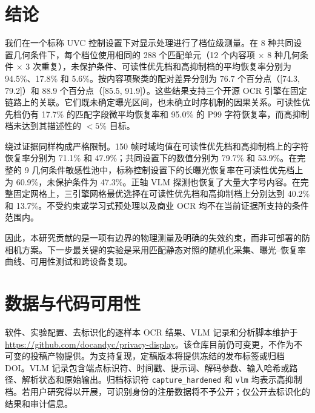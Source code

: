 \documentclass{ieeeaccess}
\begin{document}
\section{结论}
\label{sec:conclusion}

我们在一个标称 UVC 控制设置下对显示处理进行了档位级测量。在 8 种共同设置几何条件下，每个档位使用相同的 288 个匹配单元（12 个内容项 $\times$ 8 种几何条件 $\times$ 3 次重复），未保护条件、可读性优先档和高抑制档的平均恢复率分别为 94.5\%、17.8\% 和 5.6\%。按内容项聚类的配对差异分别为 76.7 个百分点（[74.3, 79.2]）和 88.9 个百分点（[85.5, 91.9]）。这些结果支持三个开源 OCR 引擎在固定链路上的关联。它们既未确定曝光区间，也未确立时序机制的因果关系。可读性优先档仍有 17.7\% 的匹配字段微平均恢复率和 95.0\% 的 P99 字符恢复率，而高抑制档未达到其描述性的 $<5\%$ 目标。

绕过证据同样构成严格限制。150 帧时域均值在可读性优先档和高抑制档上的字符恢复率分别为 71.1\% 和 47.9\%；共同设置下的数值分别为 79.7\% 和 53.9\%。在完整的 9 几何条件敏感性池中，标称控制设置下的长曝光恢复率在可读性优先档上为 60.9\%，未保护条件为 47.3\%。正轴 VLM 探测也恢复了大量大字号内容。在完整固定网格上，三引擎网格最优选择在可读性优先档和高抑制档上分别达到 40.2\% 和 13.7\%。不受约束或学习式预处理以及商业 OCR 均不在当前证据所支持的条件范围内。

因此，本研究贡献的是一项有边界的物理测量及明确的失效约束，而非可部署的防相机方案。下一步最关键的实验是采用匹配静态对照的随机化采集、曝光--恢复率曲线、可用性测试和跨设备复现。

\section*{数据与代码可用性}

软件、实验配置、去标识化的逐样本 OCR 结果、VLM 记录和分析脚本维护于 \url{https://github.com/docandyc/privacy-display}。该仓库目前仍可变更，不作为不可变的投稿产物提供。为支持复现，定稿版本将提供冻结的发布标签或归档 DOI。VLM 记录包含端点标识符、时间戳、提示词、解码参数、输入哈希或路径、解析状态和原始输出。归档标识符 \texttt{capture\_hardened} 和 \texttt{vlm} 均表示高抑制档。若用户研究得以开展，可识别身份的注册数据将不予公开；仅公开去标识化的结果和审计信息。

\end{document}
